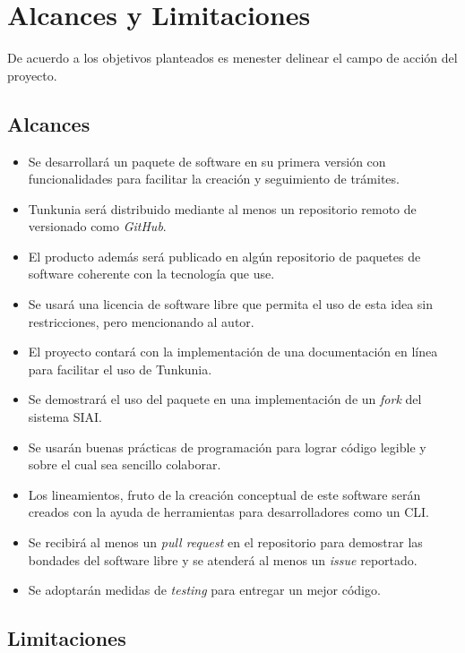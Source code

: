 \section{Alcances y Limitaciones}

De acuerdo a los objetivos planteados es menester delinear el campo de acción del proyecto.

\subsection{Alcances}

\begin{itemize}
    \item Se desarrollará un paquete de software en su primera versión con funcionalidades para facilitar la creación y seguimiento de trámites.
    \item Tunkunia será distribuido mediante al menos un repositorio remoto de versionado como \textit{GitHub}.
    \item El producto además será publicado en algún repositorio de paquetes de software coherente con la tecnología que use.
    \item Se usará una licencia de software libre que permita el uso de esta idea sin restricciones, pero mencionando al autor.
    \item El proyecto contará con la implementación de una documentación en línea para facilitar el uso de Tunkunia.
    \item Se demostrará el uso del paquete en una implementación de un \textit{fork} del sistema SIAI.
    \item Se usarán buenas prácticas de programación para lograr código legible y sobre el cual sea sencillo colaborar.
    \item Los lineamientos, fruto de la creación conceptual de este software serán creados con la ayuda de herramientas para desarrolladores como un CLI.
    \item Se recibirá al menos un \textit{pull request} en el repositorio para demostrar las bondades del software libre y se atenderá al menos un \textit{issue} reportado.
    \item Se adoptarán medidas de \textit{testing} para entregar un mejor código.

\end{itemize}

\subsection{Limitaciones}

